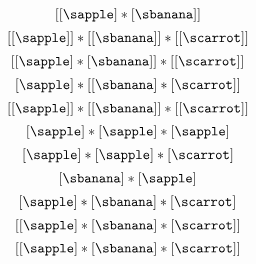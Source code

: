 {\begin{forslides}
        \begin{equation}
            \label{eq:fruit-sum-6}
            [ [ \sapple]   *  [\sbanana ] ]
        \end{equation}
        \begin{equation}
            \label{eq:fruit-sum-7}
            [ [ \sapple ] ] * [[ \sbanana ] ]  *  [[\scarrot]]
        \end{equation}
        \begin{equation}
            \label{eq:fruit-sum-7-bis}
            [ [ \sapple ]  * [ \sbanana ] ] *  [[\scarrot]]
        \end{equation}
        \begin{equation}
            \label{eq:fruit-sum-8}
            [ \sapple ]   *  [[ \sbanana ]  * [ \scarrot ]]
        \end{equation}
        \begin{equation}
            \label{eq:fruit-sum-9}
            [[ \sapple ]]  * [[ \sbanana ]] *  [[ \scarrot ]]
        \end{equation}
        \begin{equation}
            \label{eq:fruit-sum-10}
            [ \sapple ]   *  [ \sapple ]  *  [\sapple]
        \end{equation}
        \begin{equation}
            \label{eq:fruit-sum-11}
            [ \sapple ]   *  [ \sapple ]  * [ \scarrot ]
        \end{equation}
        \begin{equation}
            \label{eq:fruit-sum-12}
            [\sbanana ] * [ \sapple ]
        \end{equation}
        \begin{equation}
            \label{eq:fruit-sum-13}
            [ \sapple ]   *  [ \sbanana ]  *  [ \scarrot ]
        \end{equation}
        \begin{equation}
            \label{eq:fruit-sum-14}
            [ [ \sapple ]   *  [ \sbanana ]  *  [ \scarrot ] ]
        \end{equation}
        \begin{equation}
            \label{eq:fruit-sum-15}
            [ [ \sapple ]  *  [\sbanana]  *  [\scarrot ]  ]
        \end{equation}
        \begin{equation}

\end{equation}
\end{forslides}}
